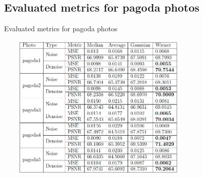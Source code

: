 \documentclass{beamer}
\begin{document}
\subsection{Evaluated metrics for pagoda photos
}
\begin{frame}{Evaluated metrics for pagoda photos
}
\begin{center}
\includegraphics[width=10cm,height=7cm]{pag1.jpg}
\end{center}
\end{frame}
\end{document}
